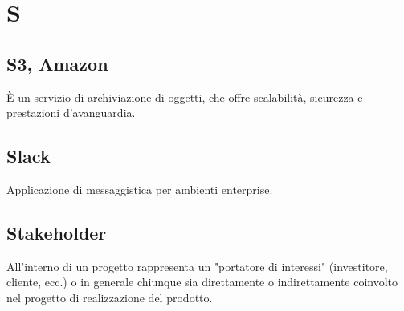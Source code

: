 \section{S}

\subsection{S3, Amazon}
È un servizio di archiviazione di oggetti, che offre scalabilità, sicurezza e prestazioni d'avanguardia. 

\subsection{Slack}
Applicazione di messaggistica per ambienti enterprise.

\subsection{Stakeholder}
All’interno di un progetto rappresenta un "portatore di interessi" (investitore, cliente, ecc.) o in generale chiunque sia direttamente o indirettamente coinvolto nel progetto di realizzazione del prodotto.

\clearpage